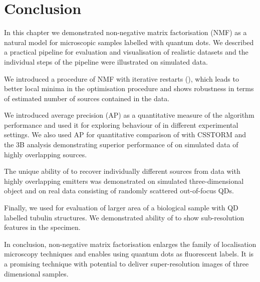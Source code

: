 \clearpage
\section{Conclusion\label{sec:Conclusion}}

In this chapter we demonstrated non-negative matrix factorisation (NMF) as a natural model for microscopic samples labelled with quantum dots. We described a practical pipeline for evaluation and visualisation of realistic datasets and the individual steps of the pipeline were illustrated on simulated data. 

We introduced a procedure of NMF with iterative restarts (\inmf{}), which leads to better local minima in the optimisation procedure and shows robustness in terms of estimated number of sources contained in the data. 

We introduced average precision (AP) as a quantitative measure  of the algorithm performance and used it for exploring behaviour of \inmf{} in different experimental settings. We also used AP for quantitative comparison of \inmf{} with CSSTORM and the 3B analysis demonstrating superior performance of \inmf{} on simulated data of highly overlapping sources. 

The unique ability of \inmf{} to recover individually different sources from data with highly overlapping emitters was demonstrated on simulated three-dimensional object and on real data consisting of randomly scattered out-of-focus QDs. 

Finally, we used \inmf{} for evaluation of larger area of a biological sample with QD labelled tubulin structures. We demonstrated ability of \inmf{} to show sub-resolution features in the specimen.

In conclusion, non-negative matrix factorisation enlarges the family of localisation microscopy techniques and enables using quantum dots as fluorescent labels. It is a promising technique with potential to deliver super-resolution images of three dimensional samples. 
